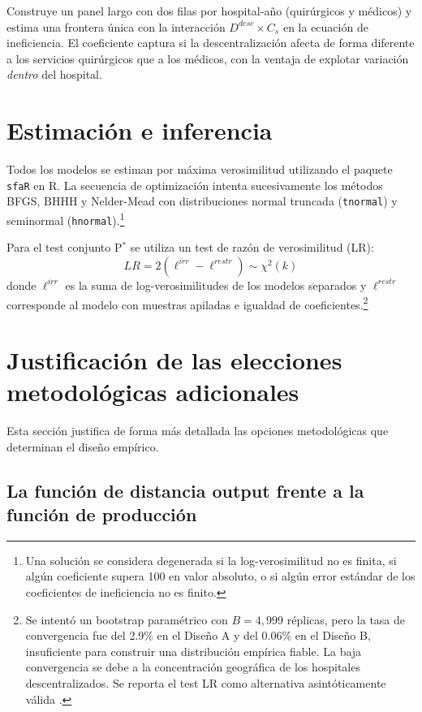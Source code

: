 Construye un panel largo con dos filas por hospital-año (quirúrgicos y médicos) y estima una frontera única con la interacción $D^{desc}\times C_s$ en la ecuación de ineficiencia. El coeficiente captura si la descentralización afecta de forma diferente a los servicios quirúrgicos que a los médicos, con la ventaja de explotar variación \textit{dentro} del hospital.

\section{Estimación e inferencia}

Todos los modelos se estiman por máxima verosimilitud utilizando el paquete \texttt{sfaR} \citep{dakpo2024} en R. La secuencia de optimización intenta sucesivamente los métodos BFGS, BHHH y Nelder-Mead con distribuciones normal truncada (\texttt{tnormal}) y seminormal (\texttt{hnormal}).\footnote{Una solución se considera degenerada si la log-verosimilitud no es finita, si algún coeficiente supera 100 en valor absoluto, o si algún error estándar de los coeficientes de ineficiencia no es finito.}

Para el test conjunto P$^*$ se utiliza un test de razón de verosimilitud (LR):
\begin{equation}
  LR = 2\left(\ell^{irr} - \ell^{restr}\right) \sim \chi^2(k)
  \label{eq:lr_test}
\end{equation}
donde $\ell^{irr}$ es la suma de log-verosimilitudes de los modelos separados y $\ell^{restr}$ corresponde al modelo con muestras apiladas e igualdad de coeficientes.\footnote{Se intentó un bootstrap paramétrico con $B=4{,}999$ réplicas, pero la tasa de convergencia fue del 2.9\% en el Diseño A y del 0.06\% en el Diseño B, insuficiente para construir una distribución empírica fiable. La baja convergencia se debe a la concentración geográfica de los hospitales descentralizados. Se reporta el test LR como alternativa asintóticamente válida \citep{simar2007}.}

\section{Justificación de las elecciones metodológicas adicionales}
\label{sec:justificacion_adicional}

Esta sección justifica de forma más detallada las opciones metodológicas que determinan el diseño empírico.

\subsection{La función de distancia output frente a la función de producción}

